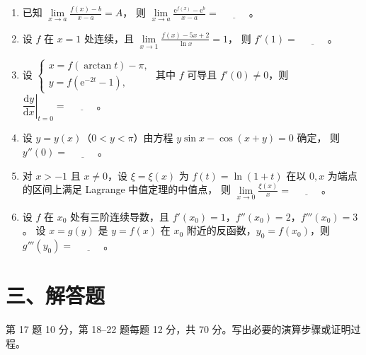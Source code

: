 \documentclass[UTF8,a4paper,zihao=-4,fontset=fandol]{ctexart}
\renewcommand{\lim}{\operatorname*{lim}\limits}
\newcommand{\blank}{\underline{\hspace{3em}}}
\begin{document}
\begin{enumerate}[start=11,itemsep=0.6em]
  \item 已知 $\displaystyle\lim_{x\to a}\frac{f(x)-b}{x-a}=A$，
  则 $\displaystyle\lim_{x\to a}\frac{\mathrm{e}^{f(x)}-\mathrm{e}^{b}}{x-a}=\blank$。

  \item 设 $f$ 在 $x=1$ 处连续，且 $\displaystyle\lim_{x\to1}\frac{f(x)-5x+2}{\ln x}=1$，
  则 $f'(1)=\blank$。

  \item 设
  $\begin{cases}
    x=f(\arctan t)-\pi,\\
    y=f(\mathrm{e}^{-2t}-1),
  \end{cases}$
  其中 $f$ 可导且 $f'(0)\ne0$，则 $\left.\dfrac{\mathrm{d}y}{\mathrm{d}x}\right|_{t=0}=\blank$。

  \item 设 $y=y(x)$（$0<y<\pi$）由方程 $y\sin x-\cos(x+y)=0$ 确定，
  则 $y''(0)=\blank$。

  \item 对 $x>-1$ 且 $x\ne0$，设 $\xi=\xi(x)$ 为 $f(t)=\ln(1+t)$
  在以 $0,x$ 为端点的区间上满足 Lagrange 中值定理的中值点，
  则 $\displaystyle\lim_{x\to0}\frac{\xi(x)}{x}=\blank$。

  \item 设 $f$ 在 $x_0$ 处有三阶连续导数，且
  $f'(x_0)=1$，$f''(x_0)=2$，$f'''(x_0)=3$。
  设 $x=g(y)$ 是 $y=f(x)$ 在 $x_0$ 附近的反函数，$y_0=f(x_0)$，则 $g'''(y_0)=\blank$。
\end{enumerate}

\newpage
\section*{三、解答题}
第 17 题 10 分，第 18--22 题每题 12 分，共 70 分。写出必要的演算步骤或证明过程。
\end{document}
